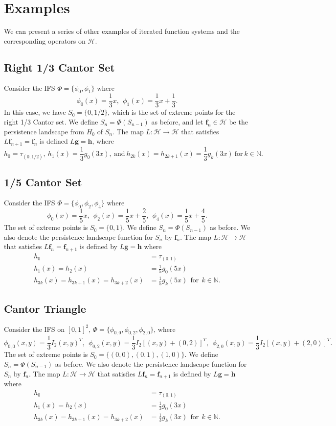 \documentclass [52pt] {article}
\newcommand{\N}{\mathbb{N}}
\newcommand{\Hil}{\mathcal{H}}
\begin{document}
\section{Examples}
We can present a series of other examples of iterated function systems and the corresponding operators on $\mathcal{H}$. 
\subsection{Right 1/3 Cantor Set}
Consider the IFS $\Phi = \{\phi_0,\phi_1\}$ where
\[\phi_0(x) = \frac{1}{3}x,\:\:\phi_1(x) = \frac{1}{3}x+\frac{1}{3}.\]
In this case, we have $S_0 = \{0,1/2\}$, which is the set of extreme points for the right 1/3 Cantor set.  We define $S_n = \Phi(S_{n-1})$ as before, and let $\mathbf{f}_n\in\Hil$ be the persistence landscape from $H_0$ of $S_n$.  The map $L:\Hil\to\Hil$ that satisfies $L\mathbf{f}_{n+1} = \mathbf{f}_n$ is defined $L\mathbf{g} = \mathbf{h}$, where
\[h_0= \tau_{(0,1/2)},\: h_1(x) = \frac{1}{3}g_0(3x),\:\text{and}\: h_{2k}(x) = h_{2k+1}(x) = \frac{1}{3}g_k(3x)\:\text{for}\: k\in\N.\]

\subsection{1/5 Cantor Set}
Consider the IFS $\Phi = \{\phi_0,\phi_2,\phi_4\}$ where
\[\phi_0(x) = \frac{1}{5}x,\:\:\phi_2(x) = \frac{1}{5}x+\frac{2}{5},\:\:\phi_4(x) = \frac{1}{5}x+\frac{4}{5}.\]
The set of extreme points is $S_0 = \{0,1\}$.  We define $S_n = \Phi(S_{n-1})$ as before.  We also denote the persistence landscape function for $S_n$ by $\mathbf{f}_n$.  The map $L:\Hil\to\Hil$ that satisfies $L\mathbf{f}_n = \mathbf{f}_{n+1}$ is defined by $L\mathbf{g} = \mathbf{h}$ where
\[\begin{split}
h_0 &= \tau_{(0,1)}\\
h_1(x) = h_2(x) &= \frac{1}{5}g_0(5x)\\
h_{3k}(x) = h_{3k+1}(x) = h_{3k+2}(x) &= \frac{1}{5}g_k(5x)\:\:\text{for}\:\:k\in\mathbb{N}.
\end{split}\]

\subsection{Cantor Triangle}
Consider the IFS on $[0,1]^2$, $\Phi = \{\phi_{0,0}, \phi_{0,2},\phi_{2,0}\}$, where
\[\phi_{0,0}(x,y) = \frac{1}{3}I_2(x,y)^T,\:\:\phi_{0,2}(x,y) = \frac{1}{3}I_2[(x,y)+(0,2)]^T,\:\:\phi_{2,0}(x,y) = \frac{1}{3}I_2[(x,y)+(2,0)]^T.\]
The set of extreme points is $S_0 = \{(0,0), (0,1),(1,0)\}$.  We define $S_n = \Phi(S_{n-1})$ as before.  We also denote the persistence landscape function for $S_n$ by $\mathbf{f}_n$.  The map $L:\Hil\to\Hil$ that satisfies $L\mathbf{f}_n = \mathbf{f}_{n+1}$ is defined by $L\mathbf{g} = \mathbf{h}$ where
\[\begin{split}
h_0 &= \tau_{(0,1)}\\
h_1(x) = h_2(x) &= \frac{1}{3}g_0(3x)\\
h_{3k}(x) = h_{3k+1}(x) = h_{3k+2}(x) &= \frac{1}{3}g_k(3x)\:\:\text{for}\:\:k\in\mathbb{N}.
\end{split}\]
\end{document}
